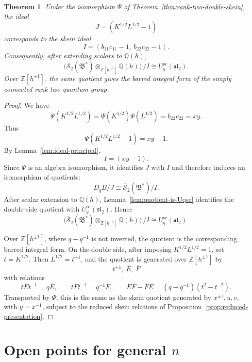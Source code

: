 \documentclass[12pt]{article}
\theoremstyle{plain}
\newtheorem{theorem}{Theorem}[section]
\theoremstyle{definition}
\numberwithin{equation}{section}
\newcommand{\Ring}{\mathbb{Z}[h^{\pm 1}]}
\newcommand{\Field}{\mathbb{Q}(h)}
\newcommand{\bigon}{\mathfrak{B}^{*}}
\newcommand{\hS}{\overline{\mathscr{S}}}
\newcommand{\DqB}{D_qB}
\newcommand{\Khalf}{K^{1/2}}
\newcommand{\Lhalf}{L^{1/2}}
\newcommand{\Ebar}{\overline{E}}
\newcommand{\Fbar}{\overline{F}}
\newcommand{\Uqsc}{U_q^{\mathrm{sc}}(\mathfrak{sl}_2)}
\begin{document}
\begin{theorem}\label{thm:rank-two-quotient}
Under the isomorphism \(\Psi\) of Theorem~\ref{thm:rank-two-double-skein}, the ideal
\[
J=(\Khalf\Lhalf-1)
\]
corresponds to the skein ideal
\[
I=(b_{11}c_{11}-1,\ b_{22}c_{22}-1).
\]
Consequently, after extending scalars to \(\Field\),
\[
\bigl(\hS_2(\bigon)\otimes_{\Ring}\Field\bigr)\,/I
\cong
\Uqsc.
\]
Over \(\Ring\), the same quotient gives the barred integral form of the simply connected rank-two quantum group.
\end{theorem}

\begin{proof}
We have
\[
\Psi(\Khalf\Lhalf)
=
\Psi(\Khalf)\Psi(\Lhalf)
=
b_{22}c_{22}
=
xy.
\]
Thus
\[
\Psi(\Khalf\Lhalf-1)=xy-1.
\]
By Lemma~\ref{lem:ideal-principal},
\[
I=(xy-1).
\]
Since \(\Psi\) is an algebra isomorphism, it identifies \(J\) with \(I\) and therefore induces an isomorphism of quotients:
\[
\DqB/J
\cong
\hS_2(\bigon)/I.
\]
After scalar extension to \(\Field\), Lemma~\ref{lem:quotient-is-Uqsc} identifies the double-side quotient with \(\Uqsc\).  Hence
\[
\bigl(\hS_2(\bigon)\otimes_{\Ring}\Field\bigr)\,/I
\cong
\Uqsc.
\]

Over \(\Ring\), where \(q-q^{-1}\) is not inverted, the quotient is the corresponding barred integral form.  On the double side, after imposing \(\Khalf\Lhalf=1\), set \(t=\Khalf\).  Then \(\Lhalf=t^{-1}\), and the quotient is generated over \(\Ring\) by
\[
t^{\pm1},\ \Ebar,\ \Fbar
\]
with relations
\[
t\Ebar t^{-1}=q\Ebar,
\qquad
t\Fbar t^{-1}=q^{-1}\Fbar,
\qquad
\Ebar\Fbar-\Fbar\Ebar=(q-q^{-1})(t^2-t^{-2}).
\]
Transported by \(\Psi\), this is the same as the skein quotient generated by \(x^{\pm1},u,v\), with \(y=x^{-1}\), subject to the reduced skein relations of Proposition~\ref{prop:reduced-presentation}.
\end{proof}

\section{Open points for general \(n\)}
\label{sec:open-points}
\end{document}
